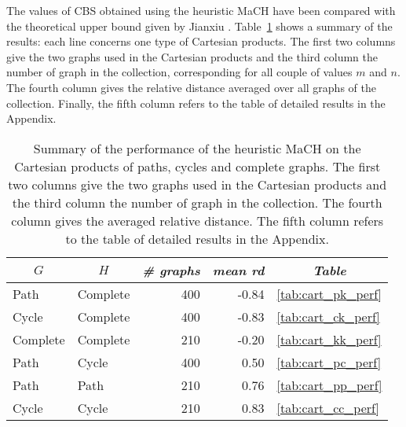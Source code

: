 \documentclass{scrartcl}
\theoremstyle{plain}
\newcommand{\algo}{MaCH}
\newcommand{\cbs}{CBS}
\begin{document}
The values of \cbs{} obtained using the heuristic \algo{} have been compared 
with the theoretical upper bound given by Jianxiu \cite{Jianxiu2001}. 
Table~\ref{tab:perf_cart_sum} shows a summary of the results: each line concerns 
one type of Cartesian products. The first two columns give the two graphs used 
in the Cartesian products and the third column the number of graph in the 
collection, corresponding for all couple of values $m$ and $n$. The fourth 
column gives the relative distance averaged over all graphs of the collection. 
Finally, the fifth column refers to the table of detailed results in the 
Appendix. 

\begin{table}[!ht]
	\centering
	\small
	\begin{tabular}{|llr|r|l|} 
	\hline
	\multicolumn{1}{|c}{$G$} & 
	\multicolumn{1}{c}{$H$} & 
	\multicolumn{1}{c|}{\emph{\# graphs}} & 
	\multicolumn{1}{c|}{\emph{mean rd}} & 
	\multicolumn{1}{c|}{\emph{Table}} \\ \hline
	
	\makeatletter{}Path & Complete & 400 & -0.84 &\ref{tab:cart_pk_perf} \\ 
Cycle & Complete & 400 & -0.83 &\ref{tab:cart_ck_perf} \\
Complete & Complete & 210 & -0.20 &\ref{tab:cart_kk_perf} \\
Path & Cycle & 400 & 0.50 &\ref{tab:cart_pc_perf} \\ 
Path & Path & 210 & 0.76 &\ref{tab:cart_pp_perf} \\
Cycle & Cycle & 210 & 0.83 &\ref{tab:cart_cc_perf} \\ 
 



 
	\hline
	\end{tabular}
	\caption{\label{tab:perf_cart_sum}Summary of the performance of the 
heuristic \algo{} on the Cartesian products of paths, cycles and complete 
graphs. The first two columns give the two graphs used in the Cartesian 
products 
and the third column the number of graph in the collection. The fourth column 
gives the averaged relative distance. The fifth column refers to the table of 
detailed results in the Appendix.}

\end{table}
\end{document}

